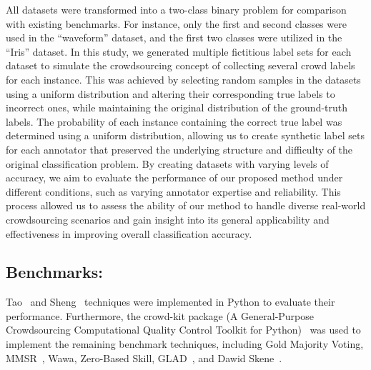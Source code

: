 \documentclass[pdflatex,bst/sn-basic]{bst/sn-jnl}%
\begin{document}
All datasets were transformed into a two-class binary problem for comparison with existing benchmarks. For instance, only the first and second classes were used in the ``waveform'' dataset, and the first two classes were utilized in the ``Iris'' dataset.
In this study, we generated multiple fictitious label sets for each dataset to simulate the crowdsourcing concept of collecting several crowd labels for each instance. This was achieved by selecting random samples in the datasets using a uniform distribution and altering their corresponding true labels to incorrect ones, while maintaining the original distribution of the ground-truth labels. The probability of each instance containing the correct true label was determined using a uniform distribution, allowing us to create synthetic label sets for each annotator that preserved the underlying structure and difficulty of the original classification problem. By creating datasets with varying levels of accuracy, we aim to evaluate the performance of our proposed method under different conditions, such as varying annotator expertise and reliability. This process allowed us to assess the ability of our method to handle diverse real-world crowdsourcing scenarios and gain insight into its general applicability and effectiveness in improving overall classification accuracy.

\subsection{Benchmarks:}

Tao~\cite{tao_Label_2020} and Sheng~\cite{sheng_Majority_2019} techniques were implemented in Python to evaluate their performance. Furthermore, the crowd-kit package (A General-Purpose Crowdsourcing Computational Quality Control Toolkit for Python)~\cite{ustalov_learningcrowdscrowdkit_2021} was used to implement the remaining benchmark techniques, including Gold Majority Voting, MMSR~\cite{ma_Adversarial_2020}, Wawa, Zero-Based Skill, GLAD~\cite{whitehill_Whose_2009}, and Dawid Skene~\cite{dawid_Maximum_1979}.
\end{document}
